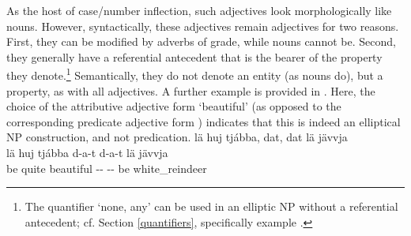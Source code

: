 As the host of case/number inflection, such adjectives look morphologically like nouns. %
However, syntactically, these adjectives remain adjectives for two reasons. First, they can be modified by adverbs of grade, while nouns cannot be. Second, they generally have a referential antecedent that is the bearer of the property they denote.\footnote{The quantifier  ‘none, any’ can be used in an elliptic NP without a referential antecedent; cf. Section \ref{quantifiers}, specifically example .} 
Semantically, they do not denote an entity (as nouns do), but a property, as with all adjectives. 
A further example is provided in . 
Here, the choice of the attributive adjective form  ‘beautiful’ (as opposed to the corresponding predicate adjective form ) indicates that this is indeed an elliptical NP construction, and not predication. 
\ea\label{adjNPheadEx4}
\glll	lä huj tjábba, dat, dat lä jävvja\\
	lä huj tjábba d-a-t d-a-t lä jävvja\\
	be\BS{} quite beautiful\BS{} -- -- be\BS{} white\_reindeer\BS{}\\\nopagebreak
{}	
\z




